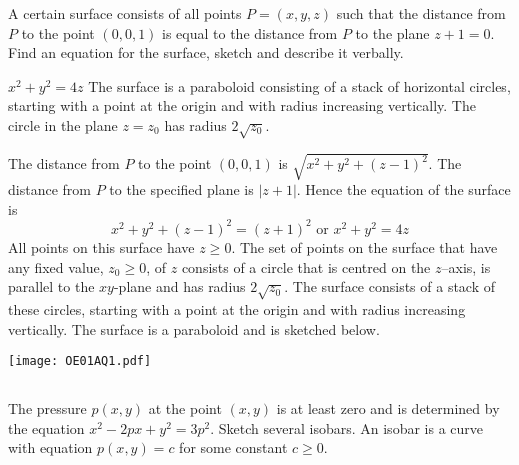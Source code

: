 \begin{question} [M200 2001A] %
A certain surface consists of all points $P=(x,y,z)$
such that the distance from $P$ to the point $(0,0,1)$ is equal to the
distance from $P$ to the plane $z+1=0$. Find an equation for the surface,
sketch and describe it verbally.
\end{question}

%

\begin{answer}
$x^2+y^2=4z$
The surface is a paraboloid consisting of a stack of horizontal circles, starting with a point at the origin and with radius increasing vertically.
The circle in the plane $z=z_0$ has radius $2\sqrt{z_0}$.
\end{answer}

\begin{solution}
The distance from $P$ to the point $(0,0,1)$ is $\sqrt{x^2+y^2+(z-1)^2}$.
The distance from $P$ to the specified plane is $|z+1|$. Hence the equation
of the surface is
\begin{equation*}
x^2+y^2+(z-1)^2=(z+1)^2\text{ or }
   x^2+y^2=4z
\end{equation*}
All points on this surface have $z\ge 0$. The set of points on the surface
that have any fixed value, $z_0\ge 0$, of $z$ consists of a circle that is
centred on the $z$--axis, is parallel to the $xy$-plane and has radius
$2\sqrt{z_0}$. The surface consists of a stack of these circles, starting
with a point at the origin and with radius increasing vertically. The surface
is a paraboloid and is sketched below.
\begin{center}
     \texttt{[image: OE01AQ1.pdf]}
\end{center}
\end{solution}



\subsection*{\Application}

\begin{question}
The pressure $p(x,y)$ at the point $(x,y)$ is at least zero and is 
determined by the equation $x^2-2px+y^2=3p^2$. Sketch several isobars. 
An isobar is a curve with equation $p(x,y)=c$ for some constant $c\ge 0$.
\end{question}


